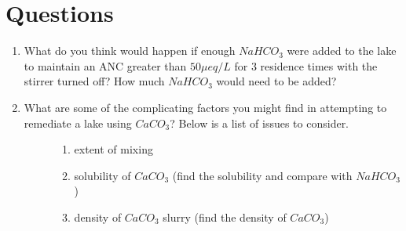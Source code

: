 \documentclass[letterpaper,10pt,english]{sphinxmanual}
\begin{document}
\section{Questions}
\label{\detokenize{Acid_Rain/Acid_Rain:questions}}\label{\detokenize{Acid_Rain/Acid_Rain:heading-acid-rain-questions}}\begin{enumerate}
\item {} 
What do you think would happen if enough \(NaHCO_3\) were added to the lake to maintain an ANC greater than \(50 \mu eq/L\) for 3 residence times with the stirrer turned off? How much \(NaHCO_3\) would need to be added?

\item {} \begin{description}
\item[{What are some of the complicating factors you might find in attempting to remediate a lake using \(CaCO_3\)? Below is a list of issues to consider.}] \leavevmode\begin{enumerate}
\item {} 
extent of mixing

\item {} 
solubility of \(CaCO_3\) (find the solubility and compare with \(NaHCO_3\))

\item {} 
density of \(CaCO_3\) slurry (find the density of \(CaCO_3\))

\end{enumerate}

\end{description}

\end{enumerate}
\end{document}
